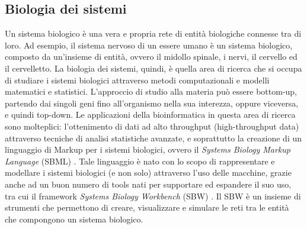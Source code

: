 \subsection{Biologia dei sistemi}
Un sistema biologico è una vera e propria rete di entità biologiche connesse tra di loro. Ad esempio, il sistema nervoso di un essere umano è un sistema biologico, composto da un'insieme di entità, ovvero il midollo spinale, i nervi, il cervello ed il cervelletto.
\newline
La biologia dei sistemi, quindi, è quella area di ricerca che si occupa di studiare i sistemi biologici attraverso metodi computazionali e modelli matematici e statistici. L'approccio di studio alla materia può essere bottom-up, partendo dai singoli geni fino all'organismo nella sua interezza, oppure viceversa, e quindi top-down.
\newline
Le applicazioni della bioinformatica in questa area di ricerca sono molteplici: l'ottenimento di dati ad alto throughput (high-throughput data) attraverso tecniche di analisi statistiche avanzate, e soprattutto la creazione di un linguaggio di Markup per i sistemi biologici, ovvero il \textit{Systems Biology Markup Language} (SBML) \cite{SBML}. Tale linguaggio è nato con lo scopo di rappresentare e modellare i sistemi biologici (e non solo) attraverso l'uso delle macchine, grazie anche ad un buon numero di tools nati per supportare ed espandere il suo uso, tra cui il framework \textit{Systems Biology Workbench} (SBW) \cite{SBW}. Il SBW è un insieme di strumenti che permettono di creare, visualizzare e simulare le reti tra le entità che compongono un sistema biologico.


